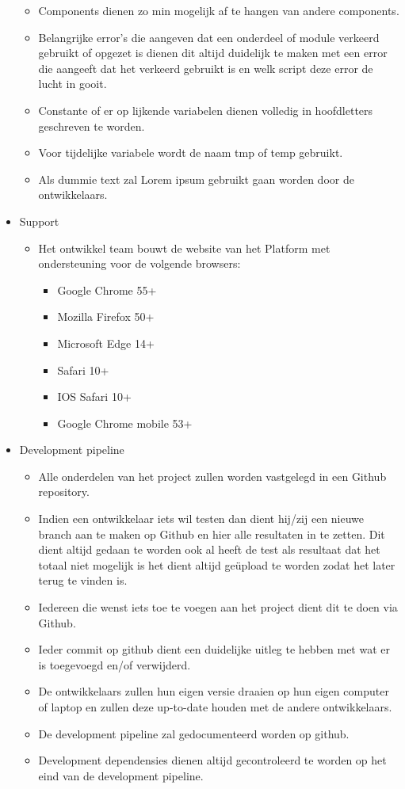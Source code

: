\documentclass[]{report}
\begin{document}
\begin{itemize}
\begin{itemize}
		\item Components dienen zo min mogelijk af te hangen van andere components.
		\item Belangrijke error's die aangeven dat een onderdeel of module verkeerd gebruikt of opgezet is dienen dit altijd duidelijk te maken met een error die aangeeft dat het verkeerd gebruikt is en welk script deze error de lucht in gooit.
		\item Constante of er op lijkende variabelen dienen volledig in hoofdletters geschreven te worden.
		\item Voor tijdelijke variabele wordt de naam tmp of temp gebruikt. 
		\item Als dummie text zal Lorem ipsum gebruikt gaan worden door de ontwikkelaars.
		\newline
	\end{itemize}

	\item Support
	\begin{itemize}
		\item Het ontwikkel team bouwt de website van het Platform met ondersteuning voor de volgende browsers:
			\begin{itemize}
			\item Google Chrome 55+
			\item Mozilla Firefox 50+
			\item Microsoft Edge 14+
			\item Safari 10+
			\item IOS Safari 10+
			\item Google Chrome mobile 53+
			\newline
			\end{itemize}
	\end{itemize}
	

	\item Development pipeline
	\begin{itemize}
		\item Alle onderdelen van het project zullen worden vastgelegd in een Github repository.
		\item Indien een ontwikkelaar iets wil testen dan dient hij/zij een nieuwe branch aan te maken op Github en hier alle resultaten in te zetten. Dit dient altijd gedaan te worden ook al heeft de test als resultaat dat het totaal niet mogelijk is het dient altijd ge\"{u}pload te worden zodat het later terug te vinden is.
		\item Iedereen die wenst iets toe te voegen aan het project dient dit te doen via Github.
		\item Ieder commit op github dient een duidelijke uitleg te hebben met wat er is toegevoegd en/of verwijderd.
		\item De ontwikkelaars zullen hun eigen versie draaien op hun eigen computer of laptop en zullen deze up-to-date houden met de andere ontwikkelaars.
		\item De development pipeline zal gedocumenteerd worden op github.
		\item Development dependensies dienen altijd gecontroleerd te worden op het eind van de development pipeline.
		\newline
	\end{itemize}


\end{itemize}
\end{document}
